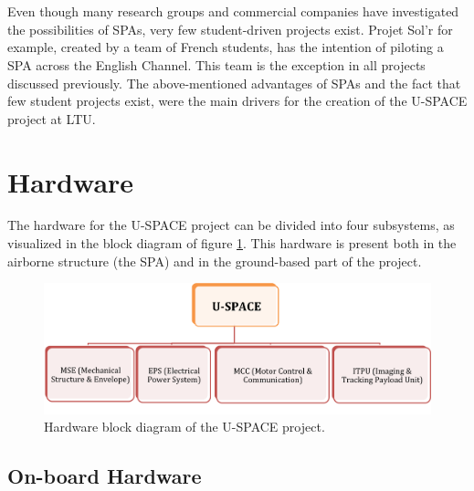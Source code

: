 \\
\\
Even though many research groups and commercial companies have investigated the possibilities of \ac{SPA}s, very few student-driven projects exist. Projet Sol'r \cite{website:solr} for example, created by a team of French students, has the intention of piloting a \ac{SPA} across the English Channel. This team is the exception in all projects discussed previously. The above-mentioned advantages of \ac{SPA}s and the fact that few student projects exist, were the main drivers for the creation of the \ac{U-SPACE} project at \ac{LTU}.

\section{Hardware}
\label{sec:intro_hardware}

The hardware for the \ac{U-SPACE} project can be divided into four subsystems, as visualized in the block diagram of figure \ref{fig:hardware_block}. This hardware is present both in the airborne structure (the \ac{SPA}) and in the ground-based part of the project. 

\begin{figure}[htbp!]
\centering
\includegraphics[width=\textwidth]{figures/hardware_block.png}
\caption{Hardware block diagram of the U-SPACE project.}
\label{fig:hardware_block}
\end{figure}

\subsection{On-board Hardware}

